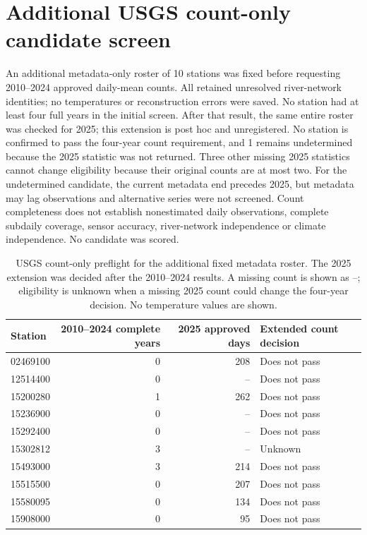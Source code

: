 \section{Additional USGS count-only candidate screen}
An additional metadata-only roster of 10 stations was fixed before requesting 2010--2024 approved daily-mean counts. All retained unresolved river-network identities; no temperatures or reconstruction errors were saved. No station had at least four full years in the initial screen. After that result, the same entire roster was checked for 2025; this extension is post hoc and unregistered. No station is confirmed to pass the four-year count requirement, and 1 remains undetermined because the 2025 statistic was not returned. Three other missing 2025 statistics cannot change eligibility because their original counts are at most two. For the undetermined candidate, the current metadata end precedes 2025, but metadata may lag observations and alternative series were not screened. Count completeness does not establish nonestimated daily observations, complete subdaily coverage, sensor accuracy, river-network independence or climate independence. No candidate was scored.
\begin{table}[p]\centering\small
\caption{USGS count-only preflight for the additional fixed metadata roster. The 2025 extension was decided after the 2010--2024 results. A missing count is shown as --; eligibility is unknown when a missing 2025 count could change the four-year decision. No temperature values are shown.}\label{tab:usgs-unresolved-counts}
\begin{tabular}{lrrl}\toprule
Station & 2010--2024 complete years & 2025 approved days & Extended count decision\\\midrule
02469100 & 0 & 208 & Does not pass\\
12514400 & 0 & -- & Does not pass\\
15200280 & 1 & 262 & Does not pass\\
15236900 & 0 & -- & Does not pass\\
15292400 & 0 & -- & Does not pass\\
15302812 & 3 & -- & Unknown\\
15493000 & 3 & 214 & Does not pass\\
15515500 & 0 & 207 & Does not pass\\
15580095 & 0 & 134 & Does not pass\\
15908000 & 0 & 95 & Does not pass\\
\bottomrule\end{tabular}
\end{table}
